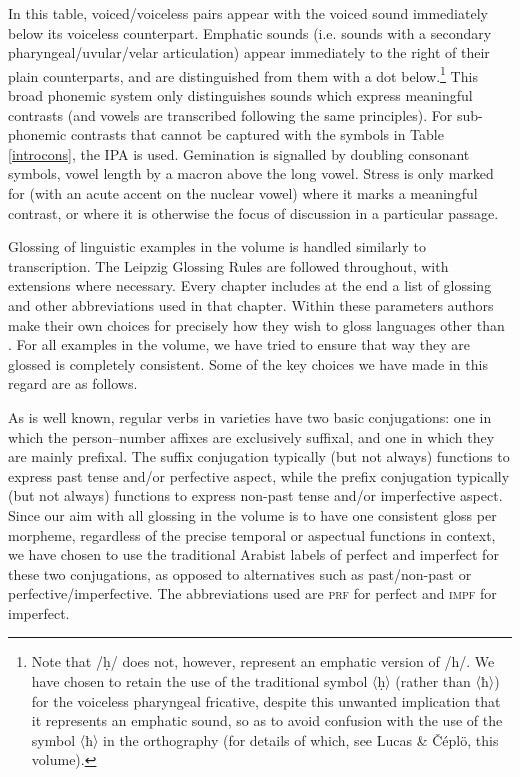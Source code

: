 \documentclass[output=paper]{langsci/langscibook}
\begin{document}
In this table, voiced/voiceless pairs appear with the voiced sound immediately below its voiceless counterpart. Emphatic sounds (i.e. sounds with a secondary {pharyngeal}/uvular/velar articulation) appear immediately to the right of their plain counterparts, and are distinguished from them with a dot below.\footnote{Note that /ḥ/ does not, however, represent an {emphatic} version of /h/. We have chosen to retain the use of the traditional symbol 〈ḥ〉 (rather than 〈ħ〉) for the voiceless {pharyngeal} fricative, despite this unwanted implication that it represents an {emphatic} sound, so as to avoid confusion with the use of the symbol 〈ħ〉 in the  {orthography} (for details of which, see Lucas \& Čéplö,  this volume).} This broad phonemic system only distinguishes sounds which express meaningful contrasts (and vowels are transcribed following the same principles). For sub-phonemic contrasts that cannot be captured with the symbols in Table \ref{introcons}, the IPA is used. Gemination is signalled by doubling consonant symbols, {vowel length} by a macron above the {long vowel}. Stress is only marked for  (with an acute accent on the nuclear vowel) where it marks a meaningful contrast, or where it is otherwise the focus of discussion in a particular passage.

Glossing of linguistic examples in the volume is handled similarly to transcription. The Leipzig Glossing Rules are followed throughout, with extensions where necessary. Every chapter includes at the end a list of glossing and other abbreviations used in that chapter. Within these parameters authors make their own choices for precisely how they wish to gloss languages other than . For all  examples in the volume, we have tried to ensure that way they are glossed is completely consistent. Some of the key choices we have made in this regard are as follows.

As is well known, regular verbs in  varieties have two basic conjugations: one in which the person--number affixes are exclusively suffixal, and one in which they are mainly prefixal. The suffix conjugation typically (but not always) functions to express past {tense} and/or perfective aspect, while the prefix conjugation typically (but not always) functions to express non-past {tense} and/or imperfective aspect. Since our aim with all glossing in the volume is to have one consistent gloss per morpheme, regardless of the precise temporal or aspectual functions in context, we have chosen to use the traditional Arabist labels of perfect and imperfect for these two conjugations, as opposed to alternatives such as past/non-past or perfective/imperfective. The abbreviations used are \textsc{prf} for perfect and \textsc{impf} for imperfect.
\end{document}
